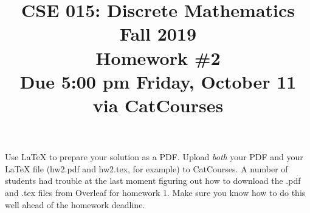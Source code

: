 \documentclass[11pt]{article}
\begin{document}
\title{CSE 015: Discrete Mathematics\\
Fall 2019\\
Homework \#2\\
Due 5:00 pm Friday, October 11 via CatCourses}

\date{}

\maketitle

\noindent Use LaTeX to prepare your solution as a PDF. Upload \emph{both} your PDF and your LaTeX file (hw2.pdf and hw2.tex, for example) to CatCourses. A number of students had trouble at the last moment figuring out how to download the .pdf and .tex files from Overleaf for homework 1. Make sure you know how to do this well ahead of the homework deadline.
\end{document}
